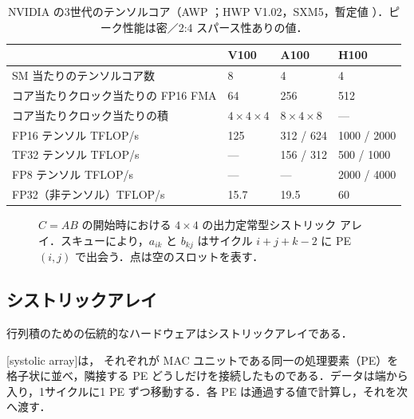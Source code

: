 \documentclass[../main.tex]{subfiles}
\begin{document}
\begin{table}[htbp]
  \centering
  \caption{NVIDIA の3世代のテンソルコア（AWP
    \cite{nvidia2020ampere}；HWP V1.02，SXM5，暫定値
    \cite{nvidia2022hopper}）．ピーク性能は密／2:4 スパース性ありの値．}
  \label{tab:l12-tensor-cores}
  \setlength{\tabcolsep}{4pt}
  \begin{tabular}{>{\raggedright\arraybackslash}p{46mm}lll}
    \toprule
    & V100 & A100 & H100 \\
    \midrule
    SM 当たりのテンソルコア数 & 8 & 4 & 4 \\
    コア当たりクロック当たりの FP16 FMA & 64 & 256 & 512 \\
    コア当たりクロック当たりの積 & $4 \times 4 \times 4$ & $8 \times 4 \times 8$ & --- \\
    \addlinespace
    FP16 テンソル TFLOP/s & 125 & 312 / 624 & 1000 / 2000 \\
    TF32 テンソル TFLOP/s & --- & 156 / 312 & 500 / 1000 \\
    FP8 テンソル TFLOP/s & --- & --- & 2000 / 4000 \\
    FP32（非テンソル）TFLOP/s & 15.7 & 19.5 & 60 \\
    \bottomrule
  \end{tabular}
\end{table}

\begin{figure}[tb]
  \centering
  
  \caption{$C = AB$ の開始時における $4 \times 4$ の出力定常型シストリック
    アレイ．スキューにより，$a_{ik}$ と $b_{kj}$ はサイクル $i + j + k - 2$
    に PE$(i,j)$ で出会う．点は空のスロットを表す．}
  \label{fig:l12-systolic}
\end{figure}

\subsection{シストリックアレイ}

行列積のための伝統的なハードウェアはシストリックアレイである．

\begin{definition}[シストリックアレイ]
  [systolic array]は，
  それぞれが MAC ユニットである同一の処理要素（PE）を格子状に並べ，隣接する
  PE どうしだけを接続したものである．データは端から入り，1サイクルに1 PE
  ずつ移動する．各 PE は通過する値で計算し，それを次へ渡す．
\end{definition}
\end{document}
